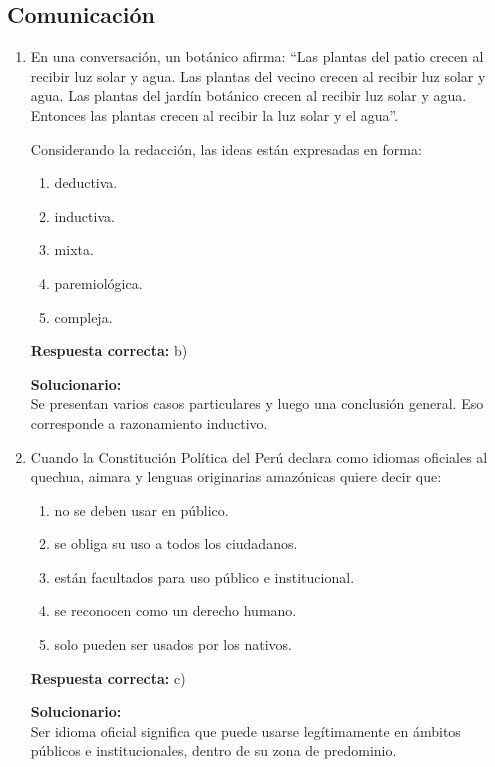 \subsection*{Comunicación}

\begin{enumerate}
	
	\item En una conversación, un botánico afirma: “Las plantas del patio crecen al recibir luz solar y agua. Las plantas del vecino crecen al recibir luz solar y agua. Las plantas del jardín botánico crecen al recibir luz solar y agua. Entonces las plantas crecen al recibir la luz solar y el agua”.
	
	Considerando la redacción, las ideas están expresadas en forma:
	\begin{enumerate}[label=\alph*)]
		\item deductiva.
		\item inductiva.
		\item mixta.
		\item paremiológica.
		\item compleja.
	\end{enumerate}
	\textbf{Respuesta correcta:} b)
	
	\vspace{2mm}
	\textbf{Solucionario:}\\
	Se presentan varios casos particulares y luego una conclusión general. Eso corresponde a razonamiento inductivo.
	
	\vspace{6mm}
	
	\item Cuando la Constitución Política del Perú declara como idiomas oficiales al quechua, aimara y lenguas originarias amazónicas quiere decir que:
	\begin{enumerate}[label=\alph*)]
		\item no se deben usar en público.
		\item se obliga su uso a todos los ciudadanos.
		\item están facultados para uso público e institucional.
		\item se reconocen como un derecho humano.
		\item solo pueden ser usados por los nativos.
	\end{enumerate}
	\textbf{Respuesta correcta:} c)
	
	\vspace{2mm}
	\textbf{Solucionario:}\\
	Ser idioma oficial significa que puede usarse legítimamente en ámbitos públicos e institucionales, dentro de su zona de predominio.
	

\end{enumerate}
